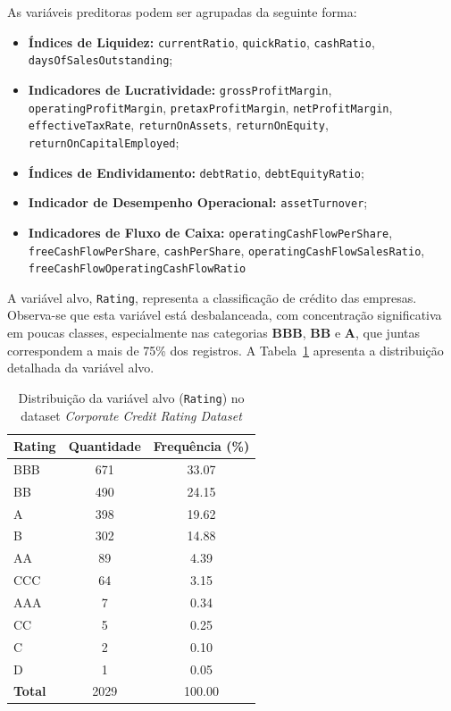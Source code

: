 As variáveis preditoras podem ser agrupadas da seguinte forma:

\begin{itemize}
    \item \textbf{Índices de Liquidez:} \texttt{currentRatio}, \texttt{quickRatio}, \texttt{cashRatio}, \texttt{daysOfSalesOutstanding};
    \item \textbf{Indicadores de Lucratividade:} \texttt{grossProfitMargin}, \texttt{operatingProfitMargin}, \texttt{pretaxProfitMargin}, \texttt{netProfitMargin}, \texttt{effectiveTaxRate}, \texttt{returnOnAssets}, \texttt{returnOnEquity}, \texttt{returnOnCapitalEmployed};
    \item \textbf{Índices de Endividamento:} \texttt{debtRatio}, \texttt{debtEquityRatio};
    \item \textbf{Indicador de Desempenho Operacional:} \texttt{assetTurnover};
    \item \textbf{Indicadores de Fluxo de Caixa:} \texttt{operatingCashFlowPerShare}, \texttt{freeCashFlowPerShare}, \texttt{cashPerShare}, \texttt{operatingCashFlowSalesRatio}, \texttt{freeCashFlowOperatingCashFlowRatio}
\end{itemize}
A variável alvo, \texttt{Rating}, representa a classificação de crédito das empresas. Observa-se que esta variável está desbalanceada, com concentração significativa em poucas classes, especialmente nas categorias \textbf{BBB}, \textbf{BB} e \textbf{A}, que juntas correspondem a mais de 75\% dos registros. A Tabela~\ref{tab:dist_rating} apresenta a distribuição detalhada da variável alvo.

\begin{table}[H]
\centering
\caption{Distribuição da variável alvo (\texttt{Rating}) no dataset \textit{Corporate Credit Rating Dataset}}
\label{tab:dist_rating}
\begin{tabular}{lcc}
\hline
\textbf{Rating} & \textbf{Quantidade} & \textbf{Frequência (\%)} \\
\hline
BBB   & 671 & 33.07 \\
BB    & 490 & 24.15 \\
A     & 398 & 19.62 \\
B     & 302 & 14.88 \\
AA    & 89  & 4.39  \\
CCC   & 64  & 3.15  \\
AAA   & 7   & 0.34  \\
CC    & 5   & 0.25  \\
C     & 2   & 0.10  \\
D     & 1   & 0.05  \\
\hline
\textbf{Total} & 2029 & 100.00 \\
\hline
\end{tabular}
\end{table}

